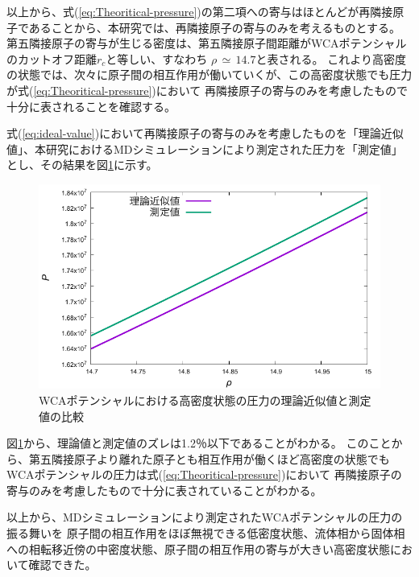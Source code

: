 \documentclass[titlepage]{jsreport}
\begin{document}
{{{以上から、式(\ref{eq:Theoritical-pressure})の第二項への寄与はほとんどが再隣接原子であることから、本研究では、再隣接原子の寄与のみを考えるものとする。
第五隣接原子の寄与が生じる密度は、第五隣接原子間距離がWCAポテンシャルのカットオフ距離$r_c$と等しい、すなわち
$\rho\,{\simeq}\,14.7$と表される。
これより高密度の状態では、次々に原子間の相互作用が働いていくが、この高密度状態でも圧力が式(\ref{eq:Theoritical-pressure})において
再隣接原子の寄与のみを考慮したもので十分に表されることを確認する。

式(\ref{eq:ideal-value})において再隣接原子の寄与のみを考慮したものを「理論近似値」、本研究におけるMDシミュレーションにより測定された圧力を「測定値」とし、その結果を図\ref{fig:highden_compare:den-pre}に示す。

\begin{figure}[htbp]
    \begin{center}
        \includegraphics[width=14cm]{fig/highden_compare:den-pre.pdf}
    \end{center}
    \caption{WCAポテンシャルにおける高密度状態の圧力の理論近似値と測定値の比較}
    \label{fig:highden_compare:den-pre}
\end{figure}

図\ref{fig:highden_compare:den-pre}から、理論値と測定値のズレは1.2％以下であることがわかる。
このことから、第五隣接原子より離れた原子とも相互作用が働くほど高密度の状態でもWCAポテンシャルの圧力は式(\ref{eq:Theoritical-pressure})において
再隣接原子の寄与のみを考慮したもので十分に表されていることがわかる。



以上から、MDシミュレーションにより測定されたWCAポテンシャルの圧力の振る舞いを
原子間の相互作用をほぼ無視できる低密度状態、流体相から固体相への相転移近傍の中密度状態、原子間の相互作用の寄与が大きい高密度状態において確認できた。



}}}
\end{document}

